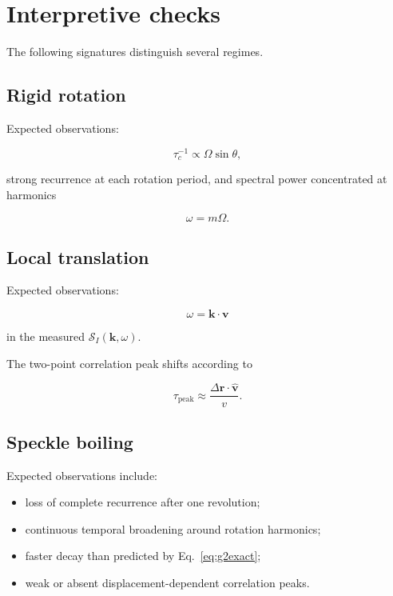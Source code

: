 \documentclass[11pt]{article}
\newcommand{\SII}{\mathcal{S}_{I}}
\newcommand{\kvec}{\mathbf{k}}
\newcommand{\rvec}{\mathbf{r}}
\begin{document}
\section{Interpretive checks}

The following signatures distinguish several regimes.

\subsection{Rigid rotation}

Expected observations:

\begin{equation}
    \tau_c^{-1}\propto\Omega\sin\theta,
\end{equation}

strong recurrence at each rotation period, and spectral power concentrated at
harmonics

\begin{equation}
    \omega=m\Omega.
\end{equation}

\subsection{Local translation}

Expected observations:

\begin{equation}
    \omega=\kvec\cdot\mathbf{v}
\end{equation}

in the measured $\SII(\kvec,\omega)$.

The two-point correlation peak shifts according to

\begin{equation}
    \tau_{\mathrm{peak}}
    \approx
    \frac{
        \Delta\rvec\cdot\hat{\mathbf{v}}
    }{
        v
    }.
\end{equation}

\subsection{Speckle boiling}

Expected observations include:

\begin{itemize}
    \item loss of complete recurrence after one revolution;
    \item continuous temporal broadening around rotation harmonics;
    \item faster decay than predicted by Eq.~\eqref{eq:g2exact};
    \item weak or absent displacement-dependent correlation peaks.
\end{itemize}
\end{document}

